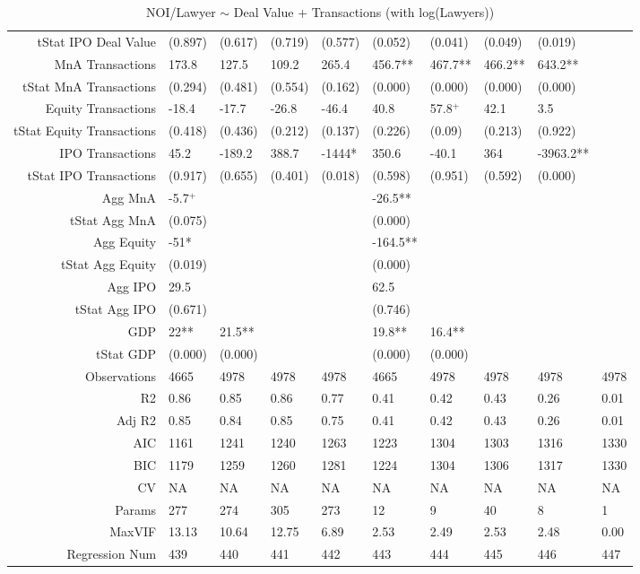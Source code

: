 \begin{table}[ht]
\begin{tabular}{rlllllllll}
  tStat IPO Deal Value & (0.897) & (0.617) & (0.719) & (0.577) & (0.052) & (0.041) & (0.049) & (0.019) &  \\ 
  MnA Transactions & 173.8 & 127.5 & 109.2 & 265.4 & 456.7** & 467.7** & 466.2** & 643.2** &  \\ 
  tStat MnA Transactions & (0.294) & (0.481) & (0.554) & (0.162) & (0.000) & (0.000) & (0.000) & (0.000) &  \\ 
  Equity Transactions & -18.4 & -17.7 & -26.8 & -46.4 & 40.8 & 57.8$^{+}$ & 42.1 & 3.5 &  \\ 
  tStat Equity Transactions & (0.418) & (0.436) & (0.212) & (0.137) & (0.226) & (0.09) & (0.213) & (0.922) &  \\ 
  IPO Transactions & 45.2 & -189.2 & 388.7 & -1444* & 350.6 & -40.1 & 364 & -3963.2** &  \\ 
  tStat IPO Transactions & (0.917) & (0.655) & (0.401) & (0.018) & (0.598) & (0.951) & (0.592) & (0.000) &  \\ 
  Agg MnA & -5.7$^{+}$ &  &  &  & -26.5** &  &  &  &  \\ 
  tStat Agg MnA & (0.075) &  &  &  & (0.000) &  &  &  &  \\ 
  Agg Equity & -51* &  &  &  & -164.5** &  &  &  &  \\ 
  tStat Agg Equity & (0.019) &  &  &  & (0.000) &  &  &  &  \\ 
  Agg IPO & 29.5 &  &  &  & 62.5 &  &  &  &  \\ 
  tStat Agg IPO & (0.671) &  &  &  & (0.746) &  &  &  &  \\ 
  GDP & 22** & 21.5** &  &  & 19.8** & 16.4** &  &  &  \\ 
  tStat GDP & (0.000) & (0.000) &  &  & (0.000) & (0.000) &  &  &  \\ 
  Observations & 4665 & 4978 & 4978 & 4978 & 4665 & 4978 & 4978 & 4978 & 4978 \\ 
  R2 & 0.86 & 0.85 & 0.86 & 0.77 & 0.41 & 0.42 & 0.43 & 0.26 & 0.01 \\ 
  Adj R2 & 0.85 & 0.84 & 0.85 & 0.75 & 0.41 & 0.42 & 0.43 & 0.26 & 0.01 \\ 
  AIC & 1161 & 1241 & 1240 & 1263 & 1223 & 1304 & 1303 & 1316 & 1330 \\ 
  BIC & 1179 & 1259 & 1260 & 1281 & 1224 & 1304 & 1306 & 1317 & 1330 \\ 
  CV & NA & NA & NA & NA & NA & NA & NA & NA & NA \\ 
  Params & 277 & 274 & 305 & 273 & 12 & 9 & 40 & 8 & 1 \\ 
  MaxVIF & 13.13 & 10.64 & 12.75 & 6.89 & 2.53 & 2.49 & 2.53 & 2.48 & 0.00 \\ 
  Regression Num & 439 & 440 & 441 & 442 & 443 & 444 & 445 & 446 & 447 \\ 
   \hline
\end{tabular}
\caption{NOI/Lawyer $\sim$ Deal Value + Transactions (with log(Lawyers))} 
\end{table}
